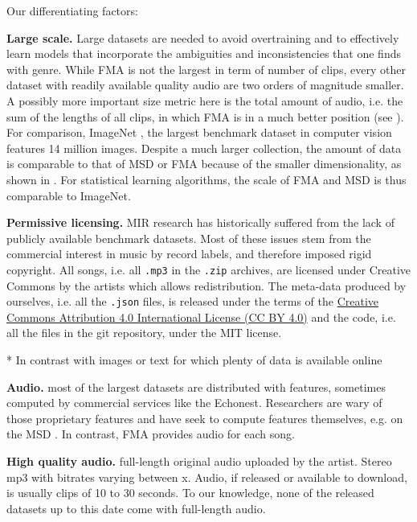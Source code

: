 \documentclass{article}
\begin{document}

Our differentiating factors:

\textbf{Large scale.} Large datasets are needed to avoid overtraining and to effectively learn models that incorporate the ambiguities and inconsistencies that one finds with genre. While FMA is not the largest in term of number of clips, every other dataset with readily available quality audio are two orders of magnitude smaller. A possibly more important size metric here is the total amount of audio, i.e. the sum of the lengths of all clips, in which FMA is in a much better position (see ). For comparison, ImageNet \cite{imagenet}, the largest benchmark dataset in computer vision features 14 million images. Despite a much larger collection, the amount of data is comparable to that of MSD or FMA because of the smaller dimensionality, as shown in . For statistical learning algorithms, the scale of FMA and MSD is thus comparable to ImageNet.

\textbf{Permissive licensing.} MIR research has historically suffered from the lack of publicly available benchmark datasets. Most of these issues stem from the commercial interest in music by record labels, and therefore imposed rigid copyright. All songs, i.e. all \texttt{.mp3} in the \texttt{.zip} archives, are licensed under Creative Commons by the artists which allows redistribution. The meta-data produced by ourselves, i.e. all the \texttt{.json} files, is released under the terms of the \href{https://creativecommons.org/licenses/by/4.0)}{Creative Commons Attribution 4.0 International License (CC BY 4.0)} and the code, i.e. all the files in the git repository, under the MIT license.

* In contrast with images or text for which plenty of data is available online

\textbf{Audio.} most of the largest datasets are distributed with features, sometimes computed by commercial services like the Echonest. Researchers are wary of those proprietary features and have seek to compute features themselves, e.g. on the MSD \cite{msd_features}. In contrast, FMA provides audio for each song.

\textbf{High quality audio.} full-length original audio uploaded by the artist. Stereo mp3 with bitrates varying between x. Audio, if released or available to download, is usually clips of 10 to 30 seconds. To our knowledge, none of the released datasets up to this date come with full-length audio.
\end{document}

